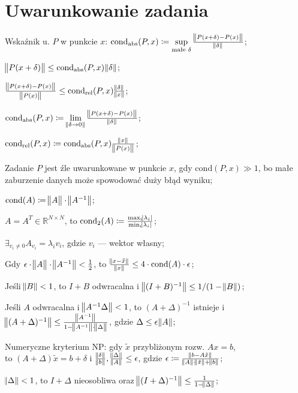 \section{Uwarunkowanie zadania}

\entry
Wskaźnik u. $P$ w punkcie $x$:
$\mathrm{cond}_{\mathrm{abs}}(P,x) \coloneqq \sup\limits_{\text{małe }\delta} \frac{\norm{P(x+\delta) - P(x)}}{\norm{\delta}}$;

\entry
$\norm{P(x+\delta)} \leq \mathrm{cond}_{\mathrm{abs}}(P,x)\norm{\delta}$;

\entry
$\frac{\norm{P(x+\delta) - P(x)}}{\norm{P(x)}} \leq \mathrm{cond}_{\mathrm{rel}}(P,x)\frac{\norm{\delta}}{\norm{x}}$;


\entry
$\mathrm{cond}_{\mathrm{abs}}(P,x) \coloneqq \lim\limits_{\norm{\delta \to 0}} \frac{\norm{P(x+\delta) - P(x)}}{\norm{\delta}}$;

\entry
$\mathrm{cond}_{\mathrm{rel}}(P,x) \coloneqq \mathrm{cond}_{\mathrm{abs}}(P,x)\frac{\norm{x}}{\norm{P(x)}} $;

\entry
Zadanie $P$ jest źle uwarunkowane w punkcie $x$,
gdy $\mathrm{cond}(P,x) \gg 1$,
bo małe zaburzenie danych może spowodować duży błąd wyniku;

\entry
$\mathrm{cond}(A) \coloneqq \norm{\vphantom{A^{-1}}A}\cdot\norm{A^{-1}}$;

\entry
$A=A^T\in\mathbb{R}^{N\times N}$,
to $\mathrm{cond}_2(A)\coloneqq \frac{\max_i\abs{\lambda_i}}{\min_i\abs{\lambda_i}}$;

\entry
$\exists_{v_i\neq 0} A_{v_i} = \lambda_i v_i$,
gdzie $v_i$ --- wektor własny;

\entry
Gdy $\epsilon\cdot\norm{\vphantom{A^1}A}\cdot\norm{A^{-1}} < \frac{1}{2}$,
to $\frac{\norm{x - \tilde{x}}}{\norm{x}} \leq 4 \cdot \mathrm{cond}(A) \cdot \epsilon$;

\entry
Jeśli $\norm{B} < 1$,
to $I+B$ odwracalna i $\norm{(I+B)^{-1}} \leq 1 / (1 - \norm{B})$;

\entry
Jeśli $A$ odwracalna i $\norm{A^{-1}\Delta} < 1$,
to $(A+\Delta)^{-1}$ istnieje
i $\norm{(A+\Delta)^{-1}} \leq \frac{\norm{A^{-1}}}{1 - \norm{A^{-1}} \cdot \norm{\vphantom{A^1}\Delta}}$,
gdzie $\Delta \leq \epsilon\norm{A}$;


\entry
Numeryczne kryterium NP:
gdy $\tilde{x}$ przybliżonym rozw. $Ax=b$,\\
to $(A+\Delta)\tilde{x}=b+\delta$
i $\frac{\norm{\delta}}{\norm{b}}, \frac{\norm{\Delta}}{\norm{A}} \leq \epsilon$,
gdzie $\epsilon \coloneqq \frac{\norm{b-A\tilde{x}}}{\norm{A} \cdot \norm{\tilde{x}} + \norm{b} }$;


\entry
$\norm{\Delta} < 1$,
to $I + \Delta$ nieosobliwa
oraz $\norm{(I + \Delta)^{-1}} \leq \frac{1}{1 - \norm{\Delta}}$;
